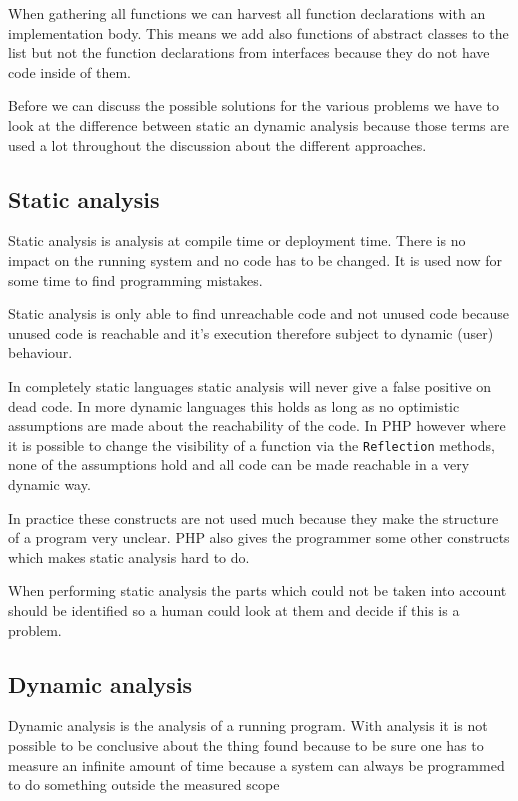 \documentclass[a4paper,10pt,twocolumn]{article}
\begin{document}
When gathering all functions we can harvest all function declarations with an implementation body. This means we add also functions of abstract classes to the list but not the function declarations from interfaces because they do not have code inside of them.

Before we can discuss the possible solutions for the various problems we have to look at the difference between static an dynamic analysis because those terms are used a lot throughout the discussion about the different approaches.

\subsection{Static analysis}
Static analysis is analysis at compile time or deployment time\cite{biggar2009draft,biggar2010}. There is no impact on the running system and no code has to be changed. It is used now for some time to find programming  mistakes\cite{gannon1979}.

Static analysis is only able to find unreachable code and not unused code because unused code is reachable and it's execution therefore subject to dynamic (user) behaviour.

In completely static languages static analysis will never give a false positive on dead code. In more dynamic languages this holds as long as no optimistic assumptions are made about the reachability of the code. In PHP however where it is possible to change the visibility of a function via the \verb|Reflection| methods, none of the assumptions hold and all code can be made reachable in a very dynamic way\cite{php}.

In practice these constructs are not used much because they make the structure of a program very unclear. PHP also gives the programmer some other constructs which makes static analysis hard to do\cite{biggar2009draft,biggar2010,devries2007}.

When performing static analysis the parts which could not be taken into account should be identified so a human could look at them and decide if this is a problem.

\subsection{Dynamic analysis}
Dynamic analysis is the analysis of a running program. With analysis it is not possible to be conclusive about the thing found because to be sure one has to measure an infinite amount of time  because a system can always be programmed to do something outside the measured scope\cite{ball1999}
\end{document}

